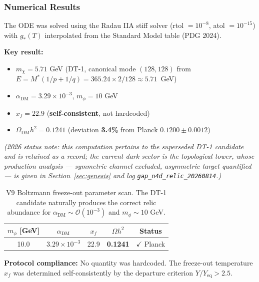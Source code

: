 \documentclass[a4paper,12pt]{article}
\begin{document}
\subsubsection{Numerical Results}
The ODE was solved using the Radau IIA stiff solver (rtol $= 10^{-8}$, atol $= 10^{-15}$) with $g_*(T)$ interpolated from the Standard Model table (PDG 2024).

\textbf{Key result:}
\begin{itemize}
    \item $m_\chi = 5.71$ GeV (DT-1, canonical mode $(128, 128)$ from $E = M^*(1/p + 1/q) = 365.24 \times 2/128 \approx 5.71$~GeV)
    \item $\alpha_{\mathrm{DM}} = 3.29 \times 10^{-3}$, $m_\phi = 10$ GeV
    \item $x_f = 22.9$ (\textbf{self-consistent}, not hardcoded)
    \item $\Omega_{\mathrm{DM}} h^2 = 0.1241$ (deviation \textbf{3.4\%} from Planck $0.1200 \pm 0.0012$)
\end{itemize}
\emph{(2026 status note: this computation pertains to the superseded DT-1 candidate and
is retained as a record; the current dark sector is the topological tower, whose
production analysis --- symmetric channel excluded, asymmetric target quantified --- is
given in Section~\ref{sec:genesis} and log \texttt{gap\_n4d\_relic\_20260814}.)}

\begin{table}[H]
\centering
\caption{V9 Boltzmann freeze-out parameter scan. The DT-1 candidate naturally produces the correct relic abundance for $\alpha_{\mathrm{DM}} \sim \mathcal{O}(10^{-3})$ and $m_\phi \sim 10$ GeV.}
\label{tab:freeze_out_v9}
\begin{tabular}{@{}ccccc@{}}
\toprule
$m_\phi$ [GeV] & $\alpha_{\mathrm{DM}}$ & $x_f$ & $\Omega h^2$ & Status \\
\midrule
10.0 & $3.29 \times 10^{-3}$ & 22.9 & \textbf{0.1241} & $\checkmark$ Planck \\
\bottomrule
\end{tabular}
\end{table}

\textbf{Protocol compliance:} No quantity was hardcoded. The freeze-out temperature $x_f$ was determined self-consistently by the departure criterion $Y/Y_{\mathrm{eq}} > 2.5$.
\end{document}
